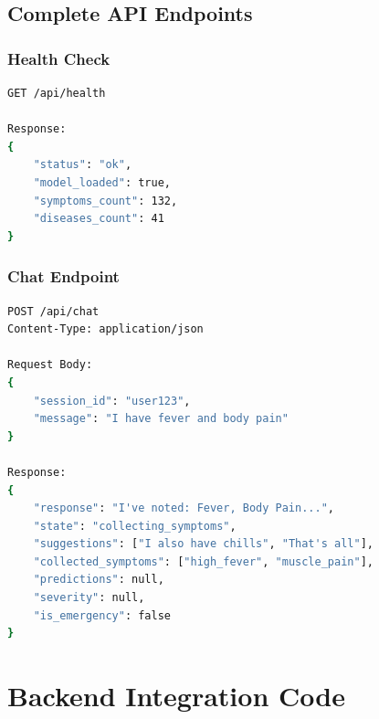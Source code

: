 \documentclass[12pt,a4paper]{article}
\begin{document}
\subsection{Complete API Endpoints}

\subsubsection{Health Check}
\begin{lstlisting}[language=bash, caption=Health Check Endpoint]
GET /api/health

Response:
{
    "status": "ok",
    "model_loaded": true,
    "symptoms_count": 132,
    "diseases_count": 41
}
\end{lstlisting}

\subsubsection{Chat Endpoint}
\begin{lstlisting}[language=bash, caption=Conversational Agent]
POST /api/chat
Content-Type: application/json

Request Body:
{
    "session_id": "user123",
    "message": "I have fever and body pain"
}

Response:
{
    "response": "I've noted: Fever, Body Pain...",
    "state": "collecting_symptoms",
    "suggestions": ["I also have chills", "That's all"],
    "collected_symptoms": ["high_fever", "muscle_pain"],
    "predictions": null,
    "severity": null,
    "is_emergency": false
}
\end{lstlisting}

\section{Backend Integration Code}
\end{document}
